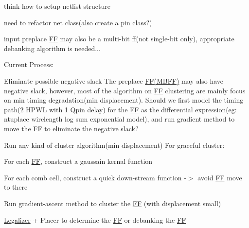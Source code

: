 
\begin{DoxyItemize}
\item think how to setup netlist structure
\item need to refactor net class(also create a pin class?)
\item input preplace \mbox{\hyperlink{classFF}{FF}} may also be a multi-\/bit ff(not single-\/bit only), appropriate debanking algorithm is needed...
\end{DoxyItemize}

Current Process\+:


\begin{DoxyEnumerate}
\item Eliminate possible negative slack The preplace \mbox{\hyperlink{classFF}{FF(\+MBFF)}} may also have negative slack, however, most of the algorithm on \mbox{\hyperlink{classFF}{FF}} clustering are mainly focus on min timing degradation(min displacement). Should we first model the timing path(2 HPWL with 1 Qpin delay) for the \mbox{\hyperlink{classFF}{FF}} as the differential expression(eg\+: ntuplace wirelength log sum exponential model), and run gradient method to move the \mbox{\hyperlink{classFF}{FF}} to eliminate the negative slack?
\item Run any kind of cluster algorithm(min displacement) For graceful cluster\+:
\begin{DoxyItemize}
\item For each \mbox{\hyperlink{classFF}{FF}}, construct a gaussain kernal function
\item For each comb cell, construct a quick down-\/stream function -\/$>$ avoid \mbox{\hyperlink{classFF}{FF}} move to there
\item Run gradient-\/ascent method to cluster the \mbox{\hyperlink{classFF}{FF}} (with displacement small)
\end{DoxyItemize}
\item \mbox{\hyperlink{classLegalizer}{Legalizer}} + Placer to determine the \mbox{\hyperlink{classFF}{FF}} or debanking the \mbox{\hyperlink{classFF}{FF}}
\end{DoxyEnumerate}
